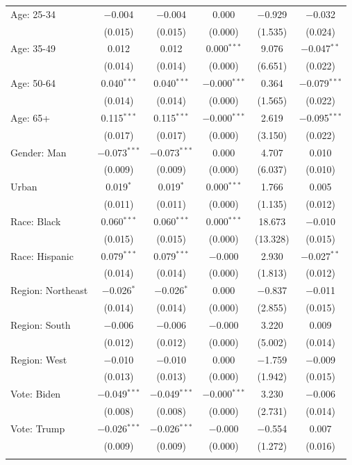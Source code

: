 \documentclass[12pt,english]{article}
\begin{document}
\begin{table}[h]
{{\begin{tabular}{@{\extracolsep{5pt}}lccccc}
  Age: 25\mbox{-}34 & $-$0.004 & $-$0.004 & 0.000 & $-$0.929 & $-$0.032 \\ 
  & (0.015) & (0.015) & (0.000) & (1.535) & (0.024) \\ 
  Age: 35\mbox{-}49 & 0.012 & 0.012 & 0.000$^{***}$ & 9.076 & $-$0.047$^{**}$ \\ 
  & (0.014) & (0.014) & (0.000) & (6.651) & (0.022) \\ 
  Age: 50\mbox{-}64 & 0.040$^{***}$ & 0.040$^{***}$ & $-$0.000$^{***}$ & 0.364 & $-$0.079$^{***}$ \\ 
  & (0.014) & (0.014) & (0.000) & (1.565) & (0.022) \\ 
  Age: 65+ & 0.115$^{***}$ & 0.115$^{***}$ & $-$0.000$^{***}$ & 2.619 & $-$0.095$^{***}$ \\ 
  & (0.017) & (0.017) & (0.000) & (3.150) & (0.022) \\ 
  Gender: Man & $-$0.073$^{***}$ & $-$0.073$^{***}$ & 0.000 & 4.707 & 0.010 \\ 
  & (0.009) & (0.009) & (0.000) & (6.037) & (0.010) \\ 
  Urban & 0.019$^{*}$ & 0.019$^{*}$ & 0.000$^{***}$ & 1.766 & 0.005 \\ 
  & (0.011) & (0.011) & (0.000) & (1.135) & (0.012) \\ 
  Race: Black & 0.060$^{***}$ & 0.060$^{***}$ & 0.000$^{***}$ & 18.673 & $-$0.010 \\ 
  & (0.015) & (0.015) & (0.000) & (13.328) & (0.015) \\ 
  Race: Hispanic & 0.079$^{***}$ & 0.079$^{***}$ & $-$0.000 & 2.930 & $-$0.027$^{**}$ \\ 
  & (0.014) & (0.014) & (0.000) & (1.813) & (0.012) \\ 
  Region: Northeast & $-$0.026$^{*}$ & $-$0.026$^{*}$ & 0.000 & $-$0.837 & $-$0.011 \\ 
  & (0.014) & (0.014) & (0.000) & (2.855) & (0.015) \\ 
  Region: South & $-$0.006 & $-$0.006 & $-$0.000 & 3.220 & 0.009 \\ 
  & (0.012) & (0.012) & (0.000) & (5.002) & (0.014) \\ 
  Region: West & $-$0.010 & $-$0.010 & 0.000 & $-$1.759 & $-$0.009 \\ 
  & (0.013) & (0.013) & (0.000) & (1.942) & (0.015) \\ 
  Vote: Biden & $-$0.049$^{***}$ & $-$0.049$^{***}$ & $-$0.000$^{***}$ & 3.230 & $-$0.006 \\ 
  & (0.008) & (0.008) & (0.000) & (2.731) & (0.014) \\ 
  Vote: Trump & $-$0.026$^{***}$ & $-$0.026$^{***}$ & $-$0.000 & $-$0.554 & 0.007 \\ 
  & (0.009) & (0.009) & (0.000) & (1.272) & (0.016) \\ 
 \hline \\[-1.8ex] 


\end{tabular}}}
\end{table}
\end{document}
